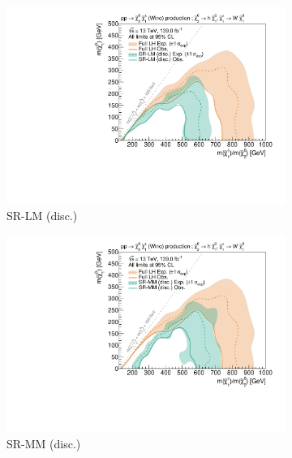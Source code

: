 \begin{figure}
	\centering
	\begin{subfigure}[b]{0.5\textwidth}
		\centering\includegraphics[width=\textwidth]{exclusion_1Lbb_SRLM_noLabel_v3}
		\caption{SR-LM (disc.)\label{fig:single_bin_SRLM}}
	\end{subfigure}\hfill
	\begin{subfigure}[b]{0.5\textwidth}
		\centering\includegraphics[width=\textwidth]{exclusion_1Lbb_SRMM_noLabel_v3}
		\caption{SR-MM (disc.)\label{fig:single_bin_SRMM}}
	\end{subfigure}\hfill
	\par\bigskip
	\begin{subfigure}[b]{0.5\textwidth}

\end{subfigure}
\end{figure}
